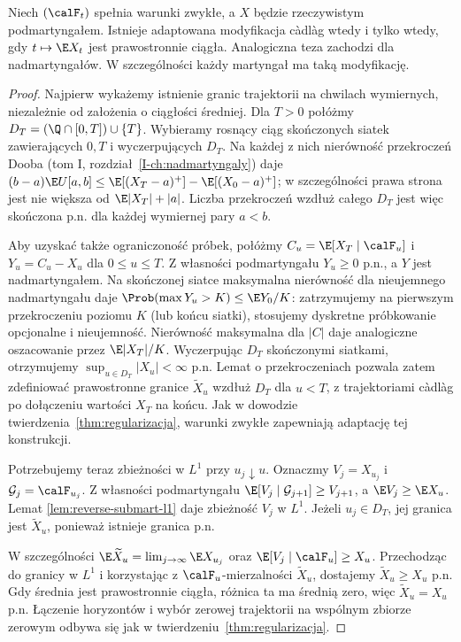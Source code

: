 \begin{twierdzenie}
\label{thm:doob-general-regularization}
Niech $(\calF_t)$ spełnia warunki zwykłe, a $X$ będzie
rzeczywistym podmartyngałem. Istnieje adaptowana
modyfikacja c\`adl\`ag wtedy i tylko wtedy, gdy
$t\mapsto\E X_t$ jest prawostronnie ciągła.
Analogiczna teza zachodzi dla nadmartyngałów.
W szczególności każdy martyngał ma taką modyfikację.
\end{twierdzenie}
\begin{proof}
Najpierw wykażemy istnienie granic trajektorii
na chwilach wymiernych, niezależnie od założenia
o ciągłości średniej. Dla $T>0$ połóżmy
$D_T=(\Q\cap[0,T])\cup\{T\}$.
Wybieramy rosnący ciąg skończonych siatek
zawierających $0,T$ i wyczerpujących $D_T$.
Na każdej z nich nierówność przekroczeń Dooba (tom I,
rozdział~\ref{I-ch:nadmartyngaly}) daje
$(b-a)\E U[a,b]\le \E[(X_T-a)^+]-
\E[(X_0-a)^+]$; w szczególności prawa strona
jest nie większa od $\E|X_T|+|a|$.
Liczba przekroczeń wzdłuż całego $D_T$
jest więc skończona p.n. dla każdej wymiernej
pary $a<b$.

Aby uzyskać także ograniczoność próbek, połóżmy
$C_u=\E[X_T\mid\calF_u]$ i $Y_u=C_u-X_u$
dla $0\le u\le T$. Z własności podmartyngału
$Y_u\ge0$ p.n., a $Y$ jest nadmartyngałem.
Na skończonej siatce maksymalna nierówność
dla nieujemnego nadmartyngału daje
$\Prob(\max Y_u>K)\le\E Y_0/K$:
zatrzymujemy na pierwszym przekroczeniu poziomu
$K$ (lub końcu siatki), stosujemy dyskretne
próbkowanie opcjonalne i nieujemność.
Nierówność maksymalna dla $|C|$ daje analogiczne
oszacowanie przez $\E|X_T|/K$.
Wyczerpując $D_T$ skończonymi siatkami, otrzymujemy
$\sup_{u\in D_T}|X_u|<\infty$ p.n.
Lemat o przekroczeniach pozwala zatem zdefiniować
prawostronne granice $\widetilde X_u$ wzdłuż $D_T$
dla $u<T$, z trajektoriami c\`adl\`ag po dołączeniu
wartości $X_T$ na końcu. Jak w dowodzie
twierdzenia~\ref{thm:regularizacja}, warunki
zwykłe zapewniają adaptację tej konstrukcji.

Potrzebujemy teraz zbieżności w $L^1$ przy
$u_j\downarrow u$. Oznaczmy $V_j=X_{u_j}$
i $\mathcal G_j=\calF_{u_j}$.
Z własności podmartyngału
$\E[V_j\mid\mathcal G_{j+1}]\ge V_{j+1}$,
a $\E V_j\ge\E X_u$. Lemat
\ref{lem:reverse-submart-l1} daje zbieżność $V_j$ w $L^1$.
Jeżeli $u_j\in D_T$, jej granica jest
$\widetilde X_u$, ponieważ istnieje granica p.n.

W szczególności $\E\widetilde X_u=
\lim_{j\to\infty}\E X_{u_j}$ oraz
$\E[V_j\mid\calF_u]\ge X_u$.
Przechodząc do granicy w $L^1$ i korzystając
z $\calF_u$-mierzalności $\widetilde X_u$,
dostajemy $\widetilde X_u\ge X_u$ p.n.
Gdy średnia jest prawostronnie ciągła,
różnica ta ma średnią zero, więc
$\widetilde X_u=X_u$ p.n.
Łączenie horyzontów i wybór zerowej trajektorii
na wspólnym zbiorze zerowym odbywa się
jak w twierdzeniu~\ref{thm:regularizacja}.


\end{proof}
